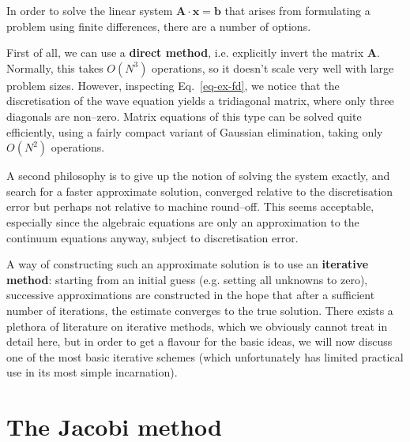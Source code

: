 \pagebreak




In order to solve the linear system ${\mathbf A}\cdot{\mathbf x}={\mathbf b}$ that arises from formulating a problem using finite differences, there are a number of options.

First of all, we can use a \textbf{direct method}, i.e. explicitly invert the matrix ${\mathbf A}$. Normally, this takes $O(N^3)$ operations, so it doesn't scale very well with large problem sizes. However, inspecting Eq.~\ref{eq-ex-fd}, we notice that the discretisation of the wave equation yields a tridiagonal matrix, where only three diagonals are non--zero. Matrix equations of this type can be solved quite efficiently, using a fairly compact variant of Gaussian elimination, taking only $O(N^2)$ operations.

A second philosophy is to give up the notion of solving the system exactly, and search for a faster approximate solution, converged relative to the discretisation error but perhaps not relative to machine round--off. This seems acceptable, especially since the algebraic equations are only an approximation to the continuum equations anyway, subject to discretisation error.

A way of constructing such an approximate solution is to use an \textbf{iterative method}: starting from an initial guess (e.g. setting all unknowns to zero), successive approximations  are constructed in the hope that after a sufficient number of iterations, the estimate converges to the true solution. There exists a plethora of literature on iterative methods, which we obviously cannot treat in detail here, but in order to get a flavour for the basic ideas, we will now discuss one of the most basic iterative schemes (which unfortunately has limited practical use in its most simple incarnation).


\pagebreak

\section{The Jacobi method}

